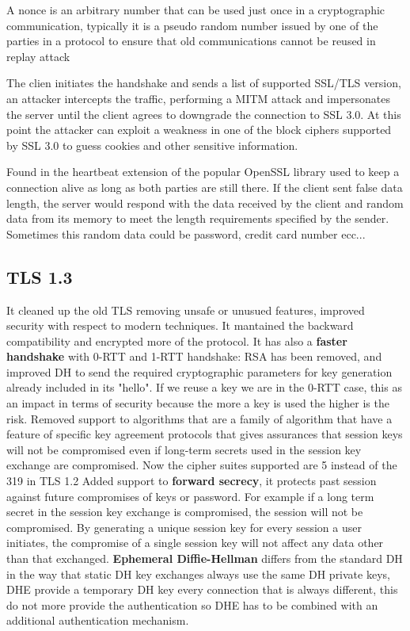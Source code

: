     A nonce is an arbitrary number that can be used just once in a cryptographic communication, typically it is a pseudo random number issued by one of the parties in a protocol to ensure that old communications cannot be reused in replay attack

    The clien initiates the handshake and sends a list of supported SSL/TLS version, an attacker intercepts the traffic, performing a MITM attack and impersonates the server until the client agrees to downgrade the connection to SSL 3.0. At this point the attacker can exploit a weakness in one of the block ciphers supported by SSL 3.0 to guess cookies and other sensitive information.

    Found in the heartbeat extension of the popular OpenSSL library used to keep a connection alive as long as both parties are still there. If the client sent false data length, the server would respond with the data received by the client and random data from its memory to meet the length requirements specified by the sender. Sometimes this random data could be password, credit card number ecc...
    
    \subsection{TLS 1.3}
    It cleaned up the old TLS removing unsafe or unusued features, improved security with respect to modern techniques. It mantained the backward compatibility and encrypted more of the protocol. It has also a \textbf{faster handshake} with 0-RTT and 1-RTT handshake: RSA has been removed, and improved DH to send the required cryptographic parameters for key generation already included in its "hello". If we reuse a key we are in the 0-RTT case, this as an impact in terms of security because the more a key is used the higher is the risk.
    Removed support to algorithms that are a family of algorithm that have a feature of specific key agreement protocols that gives assurances that session keys will not be compromised even if long-term secrets used in the session key exchange are compromised. Now the cipher suites supported are 5 instead of the 319 in TLS 1.2 Added support to \textbf{forward secrecy}, it protects past session against future compromises of keys or password. For example if a long term secret in the session key exchange is compromised, the session will not be compromised. By generating a unique session key for every session a user initiates, the compromise of a single session key will not affect any data other than that exchanged.
    \textbf{Ephemeral Diffie-Hellman} differs from the standard DH in the way that static DH key exchanges always use the same DH private keys, DHE provide a temporary DH key every connection that is always different, this do not more provide the authentication so DHE has to be combined with an additional authentication mechanism.
    